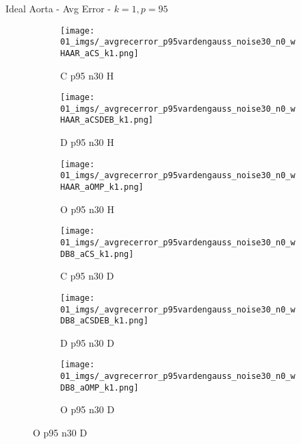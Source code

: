 \begin{frame}{Ideal Aorta - Avg Error - $k=1,p=95$}{}
\begin{figure}
\begin{subfigure}{0.13\textwidth}
\texttt{[image: 01\_imgs/\_avgrecerror\_p95vardengauss\_noise30\_n0\_wHAAR\_aCS\_k1.png]}
\caption*{\tiny C p95 n30 H}
\end{subfigure}
\begin{subfigure}{0.13\textwidth}
\texttt{[image: 01\_imgs/\_avgrecerror\_p95vardengauss\_noise30\_n0\_wHAAR\_aCSDEB\_k1.png]}
\caption*{\tiny D p95 n30 H}
\end{subfigure}
\begin{subfigure}{0.13\textwidth}
\texttt{[image: 01\_imgs/\_avgrecerror\_p95vardengauss\_noise30\_n0\_wHAAR\_aOMP\_k1.png]}
\caption*{\tiny O p95 n30 H}
\end{subfigure}
\begin{subfigure}{0.13\textwidth}
\texttt{[image: 01\_imgs/\_avgrecerror\_p95vardengauss\_noise30\_n0\_wDB8\_aCS\_k1.png]}
\caption*{\tiny C p95 n30 D}
\end{subfigure}
\begin{subfigure}{0.13\textwidth}
\texttt{[image: 01\_imgs/\_avgrecerror\_p95vardengauss\_noise30\_n0\_wDB8\_aCSDEB\_k1.png]}
\caption*{\tiny D p95 n30 D}
\end{subfigure}
\begin{subfigure}{0.13\textwidth}
\texttt{[image: 01\_imgs/\_avgrecerror\_p95vardengauss\_noise30\_n0\_wDB8\_aOMP\_k1.png]}
\caption*{\tiny O p95 n30 D}
\end{subfigure}
\end{figure}
\end{frame}


